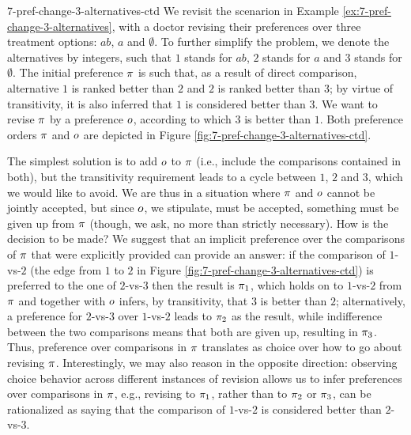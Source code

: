 \begin{xmpl}{}{7-pref-change-3-alternatives-ctd}
	We revisit the scenarion in Example \ref{ex:7-pref-change-3-alternatives},
	with a doctor revising their preferences over three treatment options:
	$ab$, $a$ and $\emptyset$.
	To further simplify the problem, we denote the alternatives by 
	integers, such that $1$ stands for $ab$, $2$ stands for $a$ and $3$ stands for $\emptyset$. 
	The initial preference $\pi$ is such that,
	as a result of direct comparison, 
	alternative $1$ is ranked better than $2$ 
	and $2$ is ranked better than $3$;
	by virtue of transitivity, it is also inferred that 
	$1$ is considered better than $3$.
	We want to revise $\pi$ by a preference $o$, 
	according to which $3$ is better than $1$. 
	Both preference orders $\pi$ and $o$ are depicted in 
	Figure \ref{fig:7-pref-change-3-alternatives-ctd}.

	The simplest solution is to add $o$ to $\pi$ 
	(i.e., include the comparisons contained in both),
	but the transitivity requirement leads to a cycle between $1$, $2$ and $3$, 
	which we would like to avoid.
	We are thus in a situation where $\pi$ and $o$ cannot be jointly accepted,
	but since $o$, we stipulate, must be accepted,
	something must be given up from $\pi$ (though,
	we ask, no more than strictly necessary). How is the decision to be made?
	We suggest that an implicit preference over the comparisons of 
	$\pi$ that were explicitly provided
	can provide an answer: if the comparison of $1$-vs-$2$ 
	(the edge from $1$ to $2$ in Figure \ref{fig:7-pref-change-3-alternatives-ctd})
	is preferred to the one of $2$-vs-$3$ then the result is $\pi_1$, which
	holds on to $1$-vs-$2$ from $\pi$ and together with $o$ infers, by transitivity, 
	that $3$ is better than $2$;
	alternatively, a preference for $2$-vs-$3$ over $1$-vs-$2$
	leads to $\pi_2$ as the result, while indifference between the two comparisons
	means that both are given up, resulting in $\pi_3$.
	Thus, preference over comparisons in $\pi$ translates as choice over how to go about revising $\pi$.
	Interestingly, we may also reason in the opposite direction:
	observing choice behavior across different instances of revision allows us to infer preferences 
	over comparisons in $\pi$, e.g., revising to $\pi_1$, rather than to $\pi_2$ or $\pi_3$,
	can be rationalized as saying that the comparison of $1$-vs-$2$
	is considered better than $2$-vs-$3$.
\end{xmpl}

